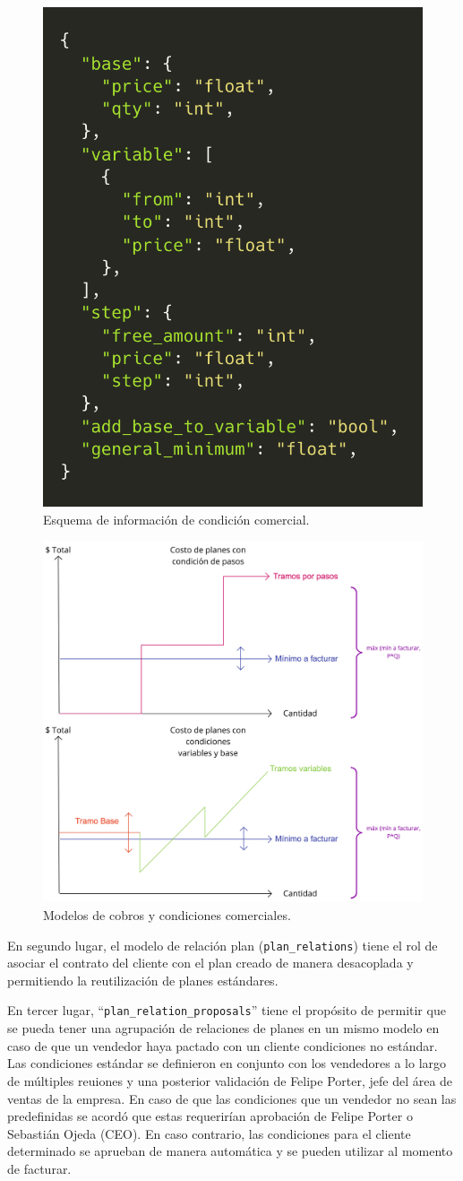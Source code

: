     \begin{figure}
      \centering
      \includegraphics[width=0.4\linewidth]{figures/cc/cc_condition_schema.png}
      \caption{Esquema de información de condición comercial.}
      \label{fig:cc_condition_schema}
    \end{figure}

    \begin{figure}
      \centering
      \includegraphics[width=0.6\linewidth]{figures/cc/cc_pricing_chart.jpg}
      \caption{Modelos de cobros y condiciones comerciales.}
      \label{fig:cc_pricing_chart}
    \end{figure}

    En segundo lugar, el modelo de relación plan (\texttt{plan\_relations}) tiene el rol de asociar el contrato del cliente con el plan creado de manera desacoplada y permitiendo la reutilización de planes estándares. 
    
    En tercer lugar, ``\texttt{plan\_relation\_proposals}'' tiene el propósito de permitir que se pueda tener una agrupación de relaciones de planes en un mismo modelo en caso de que un vendedor haya pactado con un cliente condiciones no estándar. Las condiciones estándar se definieron en conjunto con los vendedores a lo largo de múltiples reuiones y una posterior validación de Felipe Porter, jefe del área de ventas de la empresa. En caso de que las condiciones que un vendedor no sean las predefinidas se acordó que estas requerirían aprobación de Felipe Porter o Sebastián Ojeda (CEO). En caso contrario, las condiciones para el cliente determinado se aprueban de manera automática y se pueden utilizar al momento de facturar.
    
